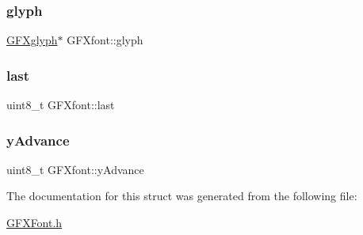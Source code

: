 \mbox{\label{struct_g_f_xfont_af63d88fa053c9a634e86eab7c96db290}} 
\subsubsection{\texorpdfstring{glyph}{glyph}}
{\footnotesize\ttfamily \mbox{\hyperlink{struct_g_f_xglyph}{G\+F\+Xglyph}}$\ast$ G\+F\+Xfont\+::glyph}

\mbox{\label{struct_g_f_xfont_a2d2ef5e8e2984dc65a7820e2906855b2}} 
\subsubsection{\texorpdfstring{last}{last}}
{\footnotesize\ttfamily uint8\+\_\+t G\+F\+Xfont\+::last}

\mbox{\label{struct_g_f_xfont_ac2c2f0184b810a562be808fbb98822fa}} 
\subsubsection{\texorpdfstring{y\+Advance}{yAdvance}}
{\footnotesize\ttfamily uint8\+\_\+t G\+F\+Xfont\+::y\+Advance}



The documentation for this struct was generated from the following file\+:\begin{DoxyCompactItemize}
\item 
\mbox{\hyperlink{_g_f_x_font_8h}{G\+F\+X\+Font.\+h}}\end{DoxyCompactItemize}
